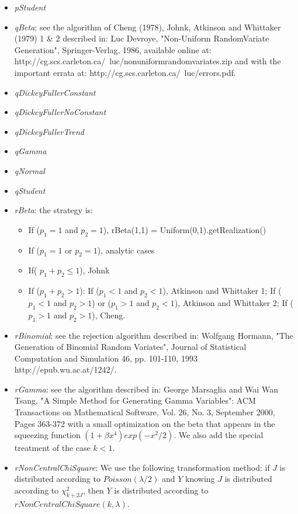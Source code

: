 \begin{itemize}
\item \textit{pStudent}
\item \textit{qBeta}: see the algorithm of Cheng (1978), Johnk, Atkinson and Whittaker (1979) 1 \& 2 described in:   Luc Devroye, "Non-Uniform RandomVariate Generation", Springer-Verlag, 1986, available online at:   http://cg.scs.carleton.ca/~luc/nonuniformrandomvariates.zip   and with the important errata at:   http://cg.scs.carleton.ca/~luc/errors.pdf.
\item \textit{qDickeyFullerConstant}
\item \textit{qDickeyFullerNoConstant}
\item \textit{qDickeyFullerTrend}
\item \textit{qGamma}
\item \textit{qNormal}
\item \textit{qStudent}
\item \textit{rBeta}: the strategy is:
\begin{itemize}
\item If ($p_1 = 1$ and $p_2 = 1$), rBeta(1,1) = Uniform(0,1).getRealization()
\item If ($p_1 = 1$ or $p_2 = 1$), analytic cases
\item If( $p_1 + p_2 \leq 1$), Johnk
\item If ($p_1 + p_2 > 1$): If ($p_1 < 1$ and $p_2 < 1$), Atkinson and Whittaker
1; If ($p_1 < 1$ and $p_2 > 1$) or ($p_1 > 1$ and $p_2 < 1$), Atkinson and
Whittaker 2; If ($p_1 > 1$ and $p_2 > 1$), Cheng.
\end{itemize}
\item \textit{rBinomial}:  see the rejection algorithm described in:
Wolfgang Hormann, "The Generation of Binomial Random Variates",
Journal of Statistical Computation and Simulation 46, pp. 101-110, 1993
http://epub.wu.ac.at/1242/.
\item \textit{rGamma}: see the algorithm described in:
George Marsaglia and Wai Wan Tsang, "A Simple Method for Generating Gamma
Variables": ACM Transactions on Mathematical Software, Vol. 26, No. 3,
September 2000, Pages 363-372
with a small optimization on the beta that appears in the squeezing function $(1 + \beta x^4)exp(-x^2/2)$.
We also add the special treatment of the case $k < 1$.
\item \textit{rNonCentralChiSquare}: We use the following transformation method: if $J$ is distributed
according to $Poisson(\lambda/2)$ and $Y$ knowing $J$ is distributed according
to $\chi^2_{k+2J}$, then $Y$ is distributed according to $rNonCentralChiSquare(k,\lambda)$.

\end{itemize}
